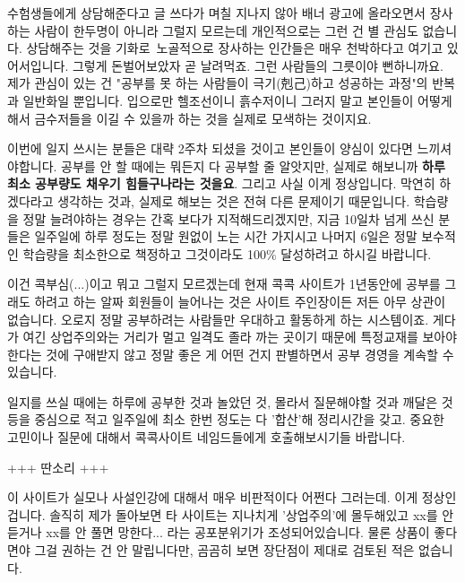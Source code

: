 수험생들에게 상담해준다고 글 쓰다가 며칠 지나지 않아
배너 광고에 올라오면서 장사하는 사람이 한두명이 아니라 그럴지 모르는데
개인적으로는 그런 건 별 관심도 없습니다.
상담해주는 것을 기화로 노골적으로 장사하는 인간들은 매우 천박하다고 여기고 있어서입니다.
그렇게 돈벌어보았자 곧 날려먹죠. 그런 사람들의 그릇이야 뻔하니까요.
제가 관심이 있는 건 "공부를 못 하는 사람들이 극기(剋己)하고 성공하는 과정"의 반복과 일반화일 뿐입니다.
입으로만 헬조선이니 흙수저이니 그러지 말고 본인들이 어떻게 해서 금수저들을 이길 수 있을까 하는 것을 실제로 모색하는 것이지요.
\vspace{5mm}

이번에 일지 쓰시는 분들은 대략 2주차 되셨을 것이고 본인들이 양심이 있다면 느끼셔야합니다.
공부를 안 할 때에는 뭐든지 다 공부할 줄 알앗지만, 실제로 해보니까 \textbf{하루 최소 공부량도 채우기 힘들구나라는 것을요}.
그리고 사실 이게 정상입니다. 막연히 하겠다라고 생각하는 것과, 실제로 해보는 것은 전혀 다른 문제이기 때문입니다.
학습량을 정말 늘려야하는 경우는 간혹 보다가 지적해드리겠지만,
지금 10일차 넘게 쓰신 분들은 일주일에 하루 정도는 정말 원없이 노는 시간 가지시고
나머지 6일은 정말 보수적인 학습량을 최소한으로 책정하고 그것이라도 100$\%$ 달성하려고 하시길 바랍니다.
\vspace{5mm}

이건 콕부심(...)이고 뭐고 그럴지 모르겠는데
현재 콕콕 사이트가 1년동안에 공부를 그래도 하려고 하는 알짜 회원들이 늘어나는 것은
사이트 주인장이든 저든 아무 상관이 없습니다. 오로지 정말 공부하려는 사람들만 우대하고 활동하게 하는 시스템이죠.
게다가 여긴 상업주의와는 거리가 멀고 일격도 졸라 까는 곳이기 때문에 특정교재를 보아야한다는 것에 구애받지 않고
정말 좋은 게 어떤 건지 판별하면서 공부 경영을 계속할 수 있습니다.
\vspace{5mm}

일지를 쓰실 때에는 하루에 공부한 것과 놀았던 것, 몰라서 질문해야할 것과 깨달은 것등을 중심으로 적고
일주일에 최소 한번 정도는 다 '합산'해 정리시간을 갖고.
중요한 고민이나 질문에 대해서 콕콕사이트 네임드들에게 호출해보시기들 바랍니다.
\vspace{5mm}

+++ 딴소리 +++
\vspace{5mm}

이 사이트가 실모나 사설인강에 대해서 매우 비판적이다 어쩐다 그러는데.
이게 정상인 겁니다. 솔직히 제가 돌아보면 타 사이트는 지나치게 '상업주의'에 몰두해있고
xx를 안 듣거나 xx를 안 풀면 망한다... 라는 공포분위기가 조성되어있습니다.
물론 상품이 좋다면야 그걸 권하는 건 안 말립니다만, 곰곰히 보면 장단점이 제대로 검토된 적은 없습니다.
\vspace{5mm}

